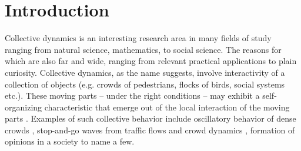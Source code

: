 \section{Introduction}
Collective dynamics is an interesting research area in many fields of study ranging from natural science, mathematics, to social science. The reasons for which are also far and wide, ranging from relevant practical applications to plain curiosity. Collective dynamics, as the name suggests, involve interactivity of a collection of objects \cite{schweitzer1997self} (e.g. crowds of pedestrians, flocks of birds, social systems etc.). These moving parts -- under the right conditions -- may exhibit a self-organizing characteristic that emerge out of the local interaction of the moving parts \cite{yates2012self}. Examples of such collective behavior include oscillatory behavior of dense crowds \cite{gu2025emergence}, stop-and-go waves from traffic flows and crowd dynamics \cite{yeo2009understanding,chraibi2016force}, formation of opinions in a society \cite{moussaid2013opinion} to name a few.
